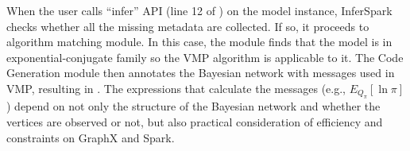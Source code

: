 When the user calls ``{\sf infer}'' API (line 12 of
) on the model instance, InferSpark checks
whether all the missing metadata are collected. If so, it proceeds to
algorithm matching module. 
In this case, the module finds that the model is in
exponential-conjugate family so the VMP algorithm is applicable to it. The
Code Generation module then annotates the Bayesian network with messages used
in VMP, resulting in . The expressions that
calculate the messages (e.g., $E_{Q_\pi}[\ln \pi]$) depend on not only the
structure of the Bayesian network and whether the vertices are observed or
not, but also practical consideration of efficiency and constraints on GraphX and Spark.

%



